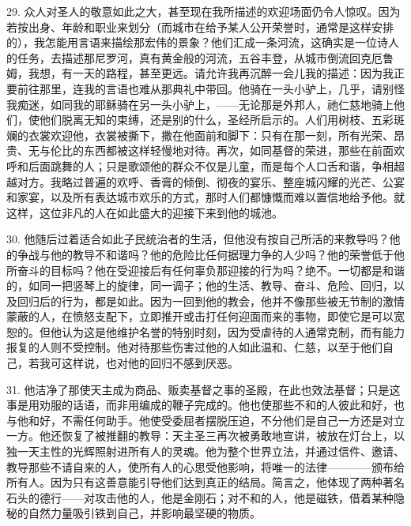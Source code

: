 29. 众人对圣人的敬意如此之大，甚至现在我所描述的欢迎场面仍令人惊叹。因为若按出身、年龄和职业来划分（而城市在给予某人公开荣誉时，通常是这样安排的），我怎能用言语来描绘那宏伟的景象？他们汇成一条河流，这确实是一位诗人的任务，去描述那尼罗河，真有黄金般的河流，五谷丰登，从城市倒流回克厄鲁姆，我想，有一天的路程，甚至更远。请允许我再沉醉一会儿我的描述：因为我正要前往那里，连我的言语也难从那典礼中带回。他骑在一头小驴上，几乎，请别怪我痴迷，如同我的耶稣骑在另一头小驴上，——无论那是外邦人，祂仁慈地骑上他们，使他们脱离无知的束缚，还是别的什么，圣经所启示的。人们用树枝、五彩斑斓的衣裳欢迎他，衣裳被撕下，撒在他面前和脚下：只有在那一刻，所有光荣、昂贵、无与伦比的东西都被这样轻慢地对待。再次，如同基督的荣进，那些在前面欢呼和后面跳舞的人；只是歌颂他的群众不仅是儿童，而是每个人口舌和谐，争相超越对方。我略过普遍的欢呼、香膏的倾倒、彻夜的宴乐、整座城闪耀的光芒、公宴和家宴，以及所有表达城市欢乐的方式，那时人们都慷慨而难以置信地给予他。就这样，这位非凡的人在如此盛大的迎接下来到他的城池。\par

30. 他随后过着适合如此子民统治者的生活，但他没有按自己所活的来教导吗？他的争战与他的教导不和谐吗？他的危险比任何据理力争的人少吗？他的荣誉低于他所奋斗的目标吗？他在受迎接后有任何辜负那迎接的行为吗？绝不。一切都是和谐的，如同一把竖琴上的旋律，同一调子；他的生活、教导、奋斗、危险、回归，以及回归后的行为，都是如此。因为一回到他的教会，他并不像那些被无节制的激情蒙蔽的人，在愤怒支配下，立即推开或击打任何迎面而来的事物，即使它是可以宽恕的。但他认为这是他维护名誉的特别时刻，因为受虐待的人通常克制，而有能力报复的人则不受控制。他对待那些伤害过他的人如此温和、仁慈，以至于他们自己，若我可这样说，也对他的回归不感到厌恶。\par

31. 他洁净了那使天主成为商品、贩卖基督之事的圣殿，在此也效法基督；只是这事是用劝服的话语，而非用编成的鞭子完成的。他也使那些不和的人彼此和好，也与他和好，不需任何助手。他使受委屈者摆脱压迫，不分他们是自己一方还是对立一方。他还恢复了被推翻的教导：天主圣三再次被勇敢地宣讲，被放在灯台上，以独一天主性的光辉照射进所有人的灵魂。他为整个世界立法，并通过信件、邀请、教导那些不请自来的人，使所有人的心思受他影响，将唯一的法律————颁布给所有人。因为只有这善意能引导他们达到真正的结局。简言之，他体现了两种著名石头的德行——对攻击他的人，他是金刚石；对不和的人，他是磁铁，借着某种隐秘的自然力量吸引铁到自己，并影响最坚硬的物质。\par

